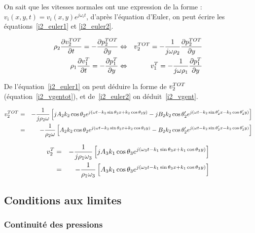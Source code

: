 On sait que les vitesses normales ont une expression de la forme : $v_i(x,y,t) = v_i(x,y)e^{j\omega_it}$, d'après
l'équation d'Euler, on peut écrire les équations~\eqref{i2_euler1} et \eqref{i2_euler2}.

\begin{eqnarray}
    \rho_2\frac{\partial v^{TOT}_2}{\partial t} = -\frac{\partial p^{TOT}_2}{\partial y} & \Leftrightarrow & v^{TOT}_2 =
    -\frac{1}{j\omega\rho_2}\frac{\partial p^{TOT}_2}{\partial y} \label{i2_euler1}\\
    \rho_1\frac{\partial v^T_1}{\partial t} = -\frac{\partial p^T_1}{\partial y} & \Leftrightarrow & v^T_1 =
    -\frac{1}{j\omega\rho_1}\frac{\partial p^T_1}{\partial y} \label{i2_euler2}\\
\end{eqnarray}

De l'équation~\eqref{i2_euler1} on peut déduire la forme de $v^{TOT}_2$ (équation~\eqref{i2_vgentot}), et
de~\eqref{i2_euler2} on déduit~\eqref{i2_vgent}.

\begin{eqnarray}
    v^{TOT}_2 & = & -\frac{1}{j\rho_2\omega}\left[jA_2k_2\cos\theta_2e^{j(\omega t-k_2\sin\theta_2x+k_2\cos\theta_2y)}
        - jB_2k_2\cos\theta_2'e^{j(\omega t - k_2\sin\theta_2'x-k_2\cos\theta_2'y)}\right]\notag\\
    & = & -\frac{1}{\rho_2\omega}\left[A_2k_2\cos\theta_2e^{j(\omega t-k_2\sin\theta_2x+k_2\cos\theta_2y)}
        - B_2k_2\cos\theta_2'e^{j(\omega t - k_2\sin\theta_2'x-k_2\cos\theta_2'y)}\right] \label{i2_vgentot}
\end{eqnarray}

\begin{eqnarray}
    v^T_2
        & = &
    -\frac{1}{j\rho_1\omega_3}\left[jA_3k_1\cos\theta_3e^{j(\omega_3t-k_1\sin\theta_3x+k_1\cos\theta_3y)}\right]\notag\\
        & = &
    -\frac{1}{\rho_1\omega_3}\left[A_3k_1\cos\theta_3e^{j(\omega_3t-k_1\sin\theta_3x+k_1\cos\theta_3y)}\right] \label{i2_vgent}
\end{eqnarray}

\subsection{Conditions aux limites}

\subsubsection{Continuité des pressions}

